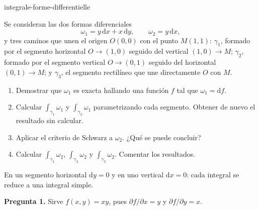 
\begin{exo}{integrale-forme-differentielle}

Se consideran las dos formas diferenciales
\[\omega_1=y\,\mathrm{d}x+x\,\mathrm{d}y,\qquad \omega_2=y\,\mathrm{d}x,\]
y tres caminos que unen el origen $O(0,0)$ con el punto $M(1,1)$: $\gamma_1$,
formado por el segmento horizontal $O\to(1,0)$ seguido del vertical
$(1,0)\to M$; $\gamma_2$, formado por el segmento vertical $O\to(0,1)$
seguido del horizontal $(0,1)\to M$; y $\gamma_3$, el segmento rectilíneo que
une directamente $O$ con $M$.

\begin{enumerate}
\item Demostrar que $\omega_1$ es exacta hallando una función $f$ tal que $\omega_1=\mathrm{d}f$.
\item Calcular $\int_{\gamma_1}\omega_1$ y $\int_{\gamma_2}\omega_1$ parametrizando cada segmento. Obtener de nuevo el resultado sin calcular.
\item Aplicar el criterio de Schwarz a $\omega_2$. ¿Qué se puede concluir?
\item Calcular $\int_{\gamma_1}\omega_2$, $\int_{\gamma_2}\omega_2$ y $\int_{\gamma_3}\omega_2$. Comentar los resultados.
\end{enumerate}

\begin{indication}
En un segmento horizontal $\mathrm{d}y=0$ y en uno vertical $\mathrm{d}x=0$:
cada integral se reduce a una integral simple.
\end{indication}

\begin{solution}
\textbf{Pregunta 1.} Sirve $f(x,y)=xy$, pues $\partial f/\partial x=y$ y $\partial f/\partial y=x$.


\end{solution}
\end{exo}
